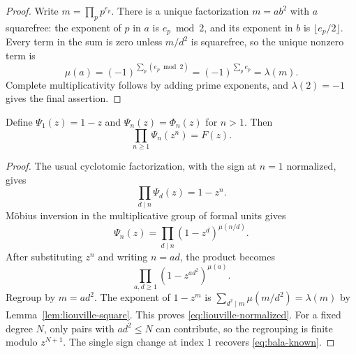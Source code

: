 \begin{proof}
Write $m=\prod_p p^{e_p}$. There is a unique factorization
$m=ab^2$ with $a$ squarefree: the exponent of $p$ in $a$ is
$e_p\bmod2$, and its exponent in $b$ is $\lfloor e_p/2\rfloor$.
Every term in the sum is zero unless $m/d^2$ is squarefree, so the unique
nonzero term is
\[
 \mu(a)=(-1)^{\sum_p(e_p\bmod2)}
        =(-1)^{\sum_p e_p}=\lambda(m).
\]
Complete multiplicativity follows by adding prime exponents, and
$\lambda(2)=-1$ gives the final assertion.
\end{proof}

\begin{lemma}\label{lem:liouville-bala}
Define $\Psi_1(z)=1-z$ and $\Psi_n(z)=\Phi_n(z)$ for $n>1$.
Then
\begin{equation}\label{eq:liouville-normalized}
 \prod_{n\ge1}\Psi_n(z^n)=F(z).
\end{equation}
\end{lemma}

\begin{proof}
The usual cyclotomic factorization, with the sign at $n=1$ normalized,
gives
\[
 \prod_{d\mid n}\Psi_d(z)=1-z^n.
\]
M\"obius inversion in the multiplicative group of formal units gives
\begin{equation}\label{eq:liouville-mobius}
 \Psi_n(z)=\prod_{d\mid n}(1-z^d)^{\mu(n/d)}.
\end{equation}
After substituting $z^n$ and writing $n=ad$, the product becomes
\[
 \prod_{a,d\ge1}(1-z^{ad^2})^{\mu(a)}.
\]
Regroup by $m=ad^2$. The exponent of $1-z^m$ is
$\sum_{d^2\mid m}\mu(m/d^2)=\lambda(m)$ by
Lemma~\ref{lem:liouville-square}. This proves
\eqref{eq:liouville-normalized}. For a fixed degree $N$, only pairs with
$ad^2\le N$ can contribute, so the regrouping is finite modulo
$z^{N+1}$. The single sign change at index $1$ recovers
\eqref{eq:bala-known}.
\end{proof}

